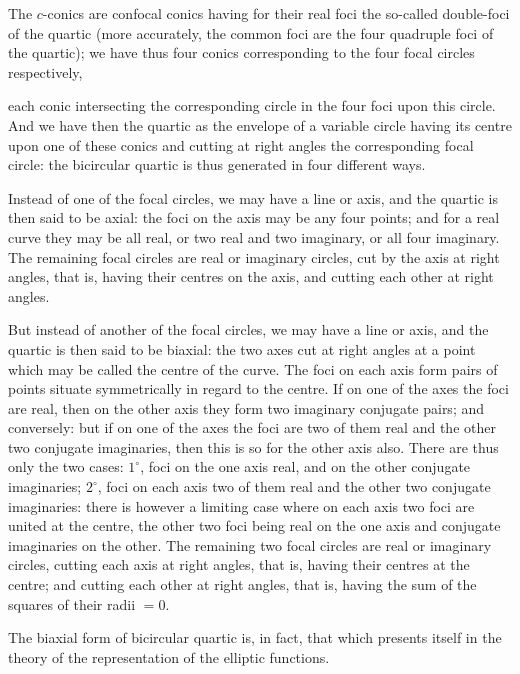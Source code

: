 \documentclass[11pt,a4paper]{article}
\begin{document}
\smallskip
The $c$-conics are confocal conics having for their real foci the so-called double-foci of the quartic (more accurately, the common foci are the four quadruple foci of the quartic); we have thus four conics corresponding to the four focal circles respectively,

\newpage

each conic intersecting the corresponding circle in the four foci upon this circle. And we have then the quartic as the envelope of a variable circle having its centre upon one of these conics and cutting at right angles the corresponding focal circle: the bicircular quartic is thus generated in four different ways.

\smallskip
Instead of one of the focal circles, we may have a line or axis, and the quartic is then said to be axial: the foci on the axis may be any four points; and for a real curve they may be all real, or two real and two imaginary, or all four imaginary. The remaining focal circles are real or imaginary circles, cut by the axis at right angles, that is, having their centres on the axis, and cutting each other at right angles.

\smallskip
But instead of another of the focal circles, we may have a line or axis, and the quartic is then said to be biaxial: the two axes cut at right angles at a point which may be called the centre of the curve. The foci on each axis form pairs of points situate symmetrically in regard to the centre. If on one of the axes the foci are real, then on the other axis they form two imaginary conjugate pairs; and conversely: but if on one of the axes the foci are two of them real and the other two conjugate imaginaries, then this is so for the other axis also. There are thus only the two cases: $1^\circ$, foci on the one axis real, and on the other conjugate imaginaries; $2^\circ$, foci on each axis two of them real and the other two conjugate imaginaries: there is however a limiting case where on each axis two foci are united at the centre, the other two foci being real on the one axis and conjugate imaginaries on the other. The remaining two focal circles are real or imaginary circles, cutting each axis at right angles, that is, having their centres at the centre; and cutting each other at right angles, that is, having the sum of the squares of their radii $= 0$.

\smallskip
The biaxial form of bicircular quartic is, in fact, that which presents itself in the theory of the representation of the elliptic functions.
\end{document}
